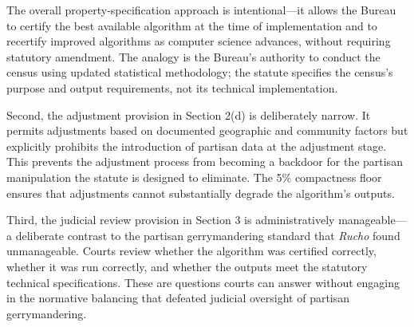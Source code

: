 The overall property-specification approach is intentional---it allows the Bureau to certify the best available algorithm at the time of implementation and to recertify improved algorithms as computer science advances, without requiring statutory amendment. The analogy is the Bureau's authority to conduct the census using updated statistical methodology; the statute specifies the census's purpose and output requirements, not its technical implementation.

Second, the adjustment provision in Section 2(d) is deliberately narrow. It permits adjustments based on documented geographic and community factors but explicitly prohibits the introduction of partisan data at the adjustment stage. This prevents the adjustment process from becoming a backdoor for the partisan manipulation the statute is designed to eliminate. The 5\% compactness floor ensures that adjustments cannot substantially degrade the algorithm's outputs.

Third, the judicial review provision in Section 3 is administratively manageable---a deliberate contrast to the partisan gerrymandering standard that \textit{Rucho} found unmanageable. Courts review whether the algorithm was certified correctly, whether it was run correctly, and whether the outputs meet the statutory technical specifications. These are questions courts can answer without engaging in the normative balancing that defeated judicial oversight of partisan gerrymandering.
